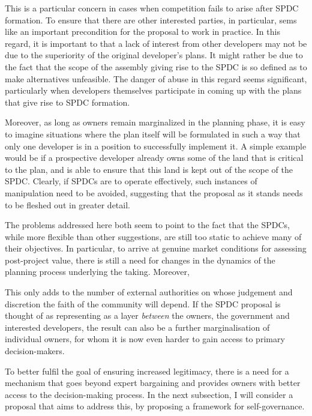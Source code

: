 {{This is a particular concern in cases when competition fails to arise after SPDC formation. To ensure that there are other interested parties, in particular, sems like an important precondition for the proposal to work in practice. In this regard, it is important to  that a lack of interest from other developers may not be due to the superiority of the original developer's plans. It might rather be due to the fact that the scope of the assembly giving rise to the SPDC is so defined as to make alternatives unfeasible. The danger of abuse in this regard seems significant, particularly when developers themselves participate in coming up with the plans that give rise to SPDC formation. 


Moreover, as long as owners remain marginalized in the planning phase, it is easy to imagine situations where the plan itself will be formulated in such a way that only one developer is in a position to successfully implement it. A simple example would be if a prospective developer already owns some of the land that is critical to the plan, and is able to ensure that this land is kept out of the scope of the SPDC. Clearly, if SPDCs are to operate effectively, such instances of manipulation need to be avoided, suggesting that the proposal as it stands needs to be fleshed out in greater detail.
}

The problems addressed here both seem to point to the fact that the SPDCs, while more flexible than other suggestions, are still too static to achieve many of their objectives. In particular, to arrive at genuine market conditions for assessing post-project value, there is still a need for changes in the dynamics of the planning process underlying the taking. Moreover,

This only adds to the number of external authorities on whose judgement and discretion the faith of the community will depend. If the SPDC proposal is thought of as representing as a layer {\it between} the owners, the government and interested developers, the result can also be a further marginalisation of individual owners, for whom it is now even harder to gain access to primary decision-makers.

To better fulfil the goal of ensuring increased legitimacy, there is a need for a mechanism that goes beyond expert bargaining and provides owners with better access to the decision-making process. In the next subsection, I will consider a proposal that aims to address this, by proposing a framework for self-governance. 
}

